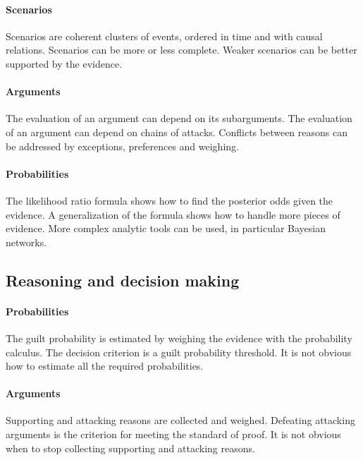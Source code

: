 \documentclass[10pt]{article}
\begin{document}
\paragraph{Scenarios}

Scenarios are coherent clusters 
of events, ordered in time and with causal relations.
Scenarios can be more or less complete.
Weaker scenarios can be better supported by the evidence.
	
\paragraph{Arguments}
The evaluation of an argument can depend on its subarguments.
The evaluation of an argument can depend on chains of attacks.
Conflicts between reasons can be addressed by exceptions, preferences and weighing.
	
\paragraph{Probabilities}

The likelihood ratio formula shows how to find the posterior odds given the evidence.
A generalization of the formula shows how to handle more pieces of evidence.
More complex analytic tools can be used, in particular Bayesian networks.

\subsection*{Reasoning and decision making}

\paragraph{Probabilities}

The guilt probability is estimated by weighing the evidence with the probability calculus.
The decision criterion is a guilt probability threshold.
It is not obvious how to estimate all the required probabilities.
	
\paragraph{Arguments}

Supporting and attacking reasons are collected and weighed.
Defeating attacking arguments is the criterion for meeting the standard of proof.
It is not obvious when to stop collecting supporting and attacking reasons.	
	
\end{document}
